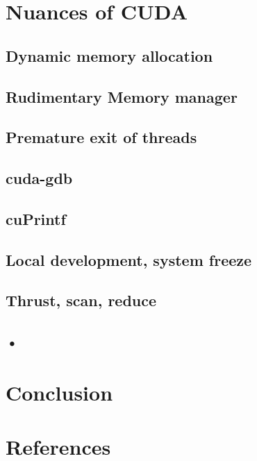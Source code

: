 \documentclass[11pt]{article}
\begin{document}
\section{Nuances of CUDA}
\subsection*{Dynamic memory allocation}
\subsection*{Rudimentary Memory manager}
\subsection*{Premature exit of threads}
\subsection*{cuda-gdb}
\subsection*{cuPrintf}
\subsection*{Local development, system freeze}
\subsection*{Thrust, scan, reduce}
\subsection*{•}
\section{Conclusion}
\section{References}
\end{document}
